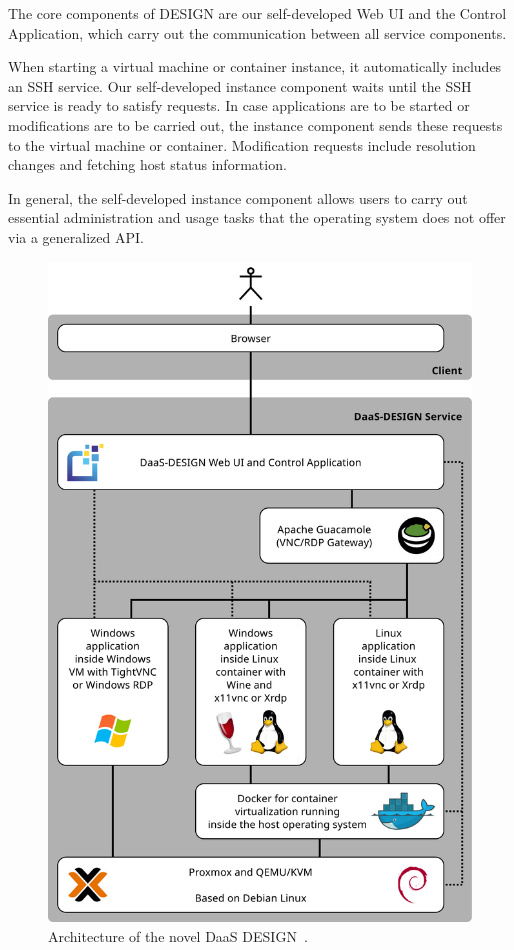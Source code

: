 \documentclass[runningheads]{llncs}
\begin{document}
The core components of DESIGN are our self-developed Web UI and the Control Application, which carry out the communication between all service components.

When starting a virtual machine or container instance, it automatically includes an SSH service. Our self-developed instance component waits until the SSH service is ready to satisfy requests. In case applications are to be started or modifications are to be carried out, the instance component sends these requests to the virtual machine or container. Modification requests include resolution changes and fetching host status information.

In general, the self-developed instance component allows users to carry out essential administration and usage tasks that the operating system does not offer via a generalized API.



\begin{figure}
	\centering
	\includegraphics[width=.9\textwidth]{images/DaaS_DESIGN_Architecture_v11_english.pdf}
	\caption{Architecture of the novel DaaS DESIGN~\cite{OJCC_2023v8i1n01_Baun}.} \label{figure_architecture}
\end{figure}
\end{document}
